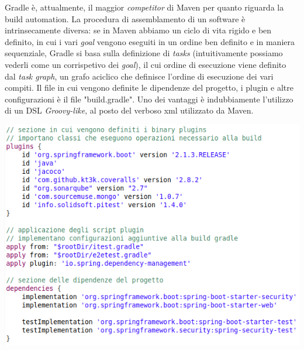 Gradle è, attualmente, il maggior \textsl{competitor} di Maven per quanto riguarda la build automation.\newline
La procedura di assemblamento di un software è intrinsecamente diversa: se in Maven abbiamo un ciclo di vita rigido e ben definito, in cui i vari \textsl{goal} vengono eseguiti in un ordine ben definito e in maniera sequenziale, Gradle si basa sulla definizione di \textsl{tasks} (intuitivamente possiamo vederli come un corrispetivo dei \textsl{goal}), il cui ordine di esecuzione viene definito dal \textsl{task graph}, un grafo aciclico che definisce l'ordine di esecuzione dei vari compiti.\newline\newline
Il file in cui vengono definite le dipendenze del progetto, i plugin e altre configurazioni è il file "build.gradle". Uno dei vantaggi è indubbiamente l'utilizzo di un DSL \textsl{Groovy-like}, al posto del verboso xml utilizzato da Maven.\newline

\vspace{1cm}
\begin{minipage}{\linewidth}
	\includegraphics[width=\textwidth]{img/build-gradle.png}
\end{minipage}

